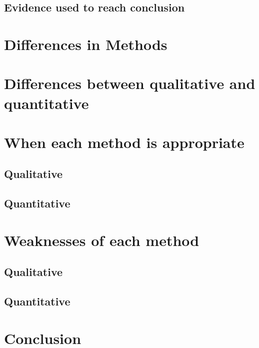 \documentclass[conference]{IEEEtran}
\begin{document}
\subsection{Evidence used to reach conclusion}

\section{Differences in Methods}

\section{Differences between qualitative and quantitative}

\section{When each method is appropriate}

\subsection{Qualitative}

\subsection{Quantitative}

\section{Weaknesses of each method}

\subsection{Qualitative}

\subsection{Quantitative}

\section{Conclusion}



\end{document}
